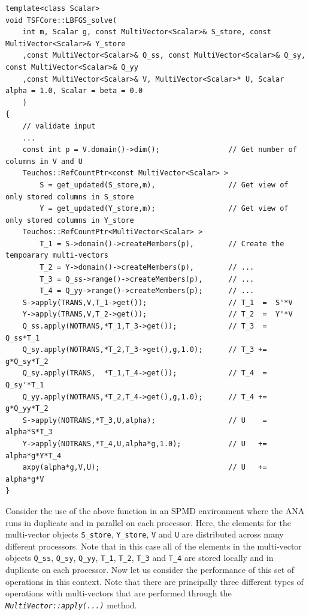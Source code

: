 {\scriptsize\begin{verbatim}
template<class Scalar>
void TSFCore::LBFGS_solve(
    int m, Scalar g, const MultiVector<Scalar>& S_store, const MultiVector<Scalar>& Y_store
    ,const MultiVector<Scalar>& Q_ss, const MultiVector<Scalar>& Q_sy, const MultiVector<Scalar>& Q_yy
    ,const MultiVector<Scalar>& V, MultiVector<Scalar>* U, Scalar alpha = 1.0, Scalar = beta = 0.0
    )
{
    // validate input
    ...
    const int p = V.domain()->dim();                // Get number of columns in V and U
    Teuchos::RefCountPtr<const MultiVector<Scalar> >
        S = get_updated(S_store,m),                 // Get view of only stored columns in S_store
        Y = get_updated(Y_store,m);                 // Get view of only stored columns in Y_store
    Teuchos::RefCountPtr<MultiVector<Scalar> >
        T_1 = S->domain()->createMembers(p),        // Create the tempoarary multi-vectors
        T_2 = Y->domain()->createMembers(p),        // ...
        T_3 = Q_ss->range()->createMembers(p),      // ...
        T_4 = Q_yy->range()->createMembers(p);      // ...
    S->apply(TRANS,V,T_1->get());                   // T_1  =  S'*V
    Y->apply(TRANS,V,T_2->get());                   // T_2  =  Y'*V
    Q_ss.apply(NOTRANS,*T_1,T_3->get());            // T_3  =  Q_ss*T_1
    Q_sy.apply(NOTRANS,*T_2,T_3->get(),g,1.0);      // T_3 +=  g*Q_sy*T_2
    Q_sy.apply(TRANS,  *T_1,T_4->get());            // T_4  =  Q_sy'*T_1
    Q_yy.apply(NOTRANS,*T_2,T_4->get(),g,1.0);      // T_4 +=  g*Q_yy*T_2
    S->apply(NOTRANS,*T_3,U,alpha);                 // U    =  alpha*S*T_3
    Y->apply(NOTRANS,*T_4,U,alpha*g,1.0);           // U   +=  alpha*g*Y*T_4
    axpy(alpha*g,V,U);                              // U   +=  alpha*g*V
}
\end{verbatim}}

Consider the use of the above function in an SPMD environment where
the ANA runs in duplicate and in parallel on each processor.  Here,
the elements for the multi-vector objects \texttt{S\_store},
\texttt{Y\_store}, \texttt{V} and \texttt{U} are distributed across
many different processors.  Note that in this case all of the elements
in the multi-vector objects \texttt{Q\_ss}, \texttt{Q\_sy}, \texttt{Q\_yy},
\texttt{T\_1}, \texttt{T\_2}, \texttt{T\_3} and \texttt{T\_4} are stored
locally and in duplicate on each processor.  Now let us consider the
performance of this set of operations in this context.  Note that
there are principally three different types of operations with
multi-vectors that are performed through the
\texttt{\textit{Multi\-Vector\-::apply(\-...)}} method.


